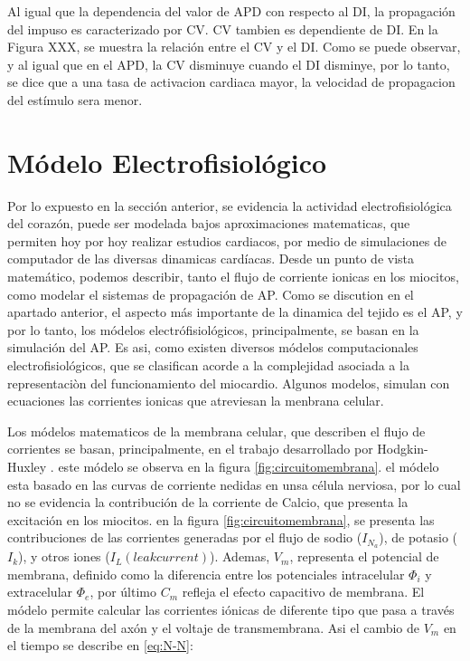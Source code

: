 Al igual que la dependencia del valor de \ac{APD} con respecto al \ac{DI},  la
propagación del impuso es caracterizado por \acf{CV}. \ac{CV} tambien
es dependiente de \ac{DI}. En la Figura XXX, se muestra la relación entre el
\ac{CV} y el \ac{DI}. Como se puede observar, y al igual que en el \ac{APD}, la
\ac{CV} disminuye cuando el \ac{DI} disminye, por lo tanto, se dice que a una
tasa de activacion cardiaca mayor, la velocidad de propagacion del estímulo sera
menor.


\section{Módelo Electrofisiológico} \label{sec:modelElectrofi}

Por lo expuesto en la sección anterior, se evidencia la actividad
electrofisiológica del corazón, puede ser  modelada bajos aproximaciones
matematicas, que permiten hoy por hoy realizar estudios cardiacos, por medio de
simulaciones de computador de las diversas dinamicas cardíacas. Desde un punto
de vista matemático, podemos describir, tanto el flujo de corriente ionicas en
los miocitos, como modelar el sistemas de propagación de \ac{AP}. Como se discution en el apartado
anterior, el aspecto más importante de la dinamica del tejido es el \ac{AP}, y
por lo tanto, los módelos  electrófisiológicos, principalmente, se basan  en la
simulación del \ac{AP}. Es asi, como existen diversos módelos computacionales
electrofisiológicos, que se clasifican acorde  a la complejidad asociada a la
representaciòn del funcionamiento del miocardio. Algunos modelos, simulan con
ecuaciones las corrientes ionicas que atreviesan la menbrana celular.


Los módelos matematicos de la membrana celular, que describen el
flujo de corrientes se basan, principalmente, en el
trabajo desarrollado por Hodgkin-Huxley \cite{Hodgkin52}. este módelo se observa
en la figura \ref{fig:circuitomembrana}. el módelo esta  basado en las curvas de corriente
nedidas en unsa célula nerviosa, por lo cual no se evidencia la contribución de
la corriente de Calcio, que presenta la excitación en los miocitos. en la figura
\ref{fig:circuitomembrana}, se presenta las contribuciones de las corrientes
generadas por el flujo de sodio ($I_{N_a}$), de potasio ($I_{k}$),  y otros
iones ($I_L (leak current)$). Ademas,  $V_m$,  representa el potencial de
membrana, definido como la diferencia entre los potenciales intracelular
$\Phi_i$ y extracelular $\Phi_e$, por último $C_m$ refleja el efecto
capacitivo de membrana. El módelo permite calcular las corrientes iónicas de
diferente tipo que pasa a través de la membrana del axón y el voltaje de
transmembrana. Asi el cambio  de $V_m$ en el tiempo se describe en
 \ref{eq:N-N}:


